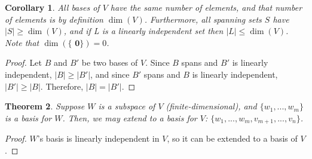 \documentclass[12pt]{article}
\newtheorem{thm}{Theorem}[section]
\newtheorem{cor}[thm]{Corollary}
\theoremstyle{definition}
\theoremstyle{remark}
\numberwithin{equation}{section}
\newcommand\B[1]{\textbf{ #1}}
\begin{document}
\vspace{15pt}

\begin{cor}
        All bases of $V$ have the same number of elements, and that number of elements is by definition $\dim(V)$. Furthermore, all spanning sets $S$ have $|S| \geq \dim(V)$, and if L is a linearly independent set then $|L| \leq \dim(V)$. Note that $\dim(\{\B{0}\}) = 0$.
\end{cor}
\begin{proof}
        Let $B$ and $B'$ be two bases of $V$. Since $B$ spans and $B'$ is linearly independent, $|B| \geq |B'|$, and since $B'$ spans and $B$ is linearly independent, $|B'| \geq |B|$. Therefore, $|B| = |B'|$.
\end{proof}

\vspace{15pt}

\begin{thm}
        Suppose $W$ is a subspace of $V$ (finite-dimensional), and $\{w_1,...,w_m\}$ is a basis for $W$. Then, we may extend to a basis for $V$: $\{w_1,...,w_m,v_{m+1},...,v_n\}$.
\end{thm}
\begin{proof}
        $W$'s basis is linearly independent in $V$, so it can be extended to a basis of $V$.
\end{proof}

\vspace{15pt}
\end{document}
